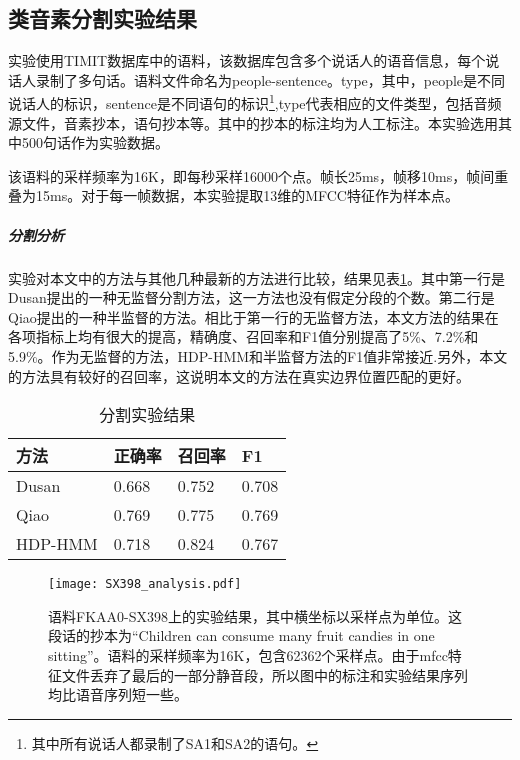 \subsection{类音素分割实验结果}
实验使用TIMIT\cite{Garofolo:93:TIMIT}数据库中的语料，该数据库包含多个说话人的语音信息，每个说话人录制了多句话。语料文件命名为people-sentence。type，其中，people是不同说话人的标识，sentence是不同语句的标识\footnote{其中所有说话人都录制了SA1和SA2的语句。},type代表相应的文件类型，包括音频源文件，音素抄本，语句抄本等。其中的抄本的标注均为人工标注。本实验选用其中500句话作为实验数据。

该语料的采样频率为16K，即每秒采样16000个点。帧长25ms，帧移10ms，帧间重叠为15ms。对于每一帧数据，本实验提取13维的MFCC特征作为样本点。
\subparagraph{分割分析}
实验对本文中的方法与其他几种最新的方法进行比较，结果见表\ref{table:p_sg_result}。其中第一行是Dusan提出的一种无监督分割方法\cite{dusan2006relation}，这一方法也没有假定分段的个数。第二行是Qiao提出的一种半监督的方法\cite{qiao2008unsupervised}。相比于第一行的无监督方法，本文方法的结果在各项指标上均有很大的提高，精确度、召回率和F1值分别提高了5\%、7.2\%和5.9\%。作为无监督的方法，HDP-HMM和半监督方法\cite{qiao2008unsupervised}的F1值非常接近.另外，本文的方法具有较好的召回率，这说明本文的方法在真实边界位置匹配的更好。

\begin{table}
\vspace{4pt}
\begin{center}\small
\begin{tabular}{|l|l|l|l|}
\hline \bf 方法 & \bf 正确率 & \bf 召回率 & \bf F1 \\ \hline
Dusan\cite{dusan2006relation} & 0.668 &0.752 &  0.708 \\ \hline
Qiao\cite{qiao2008unsupervised} &  0.769 & 0.775 & 0.769 \\ \hline
HDP-HMM &  0.718 & 0.824 & 0.767 \\ \hline
\end{tabular}
\end{center}
\vspace{-8pt}
\caption{分割实验结果}\label{table:p_sg_result}
\vspace{-4pt}
\end{table}

\begin{figure}
\texttt{[image: SX398\_analysis.pdf]} 
\vspace{-4pt}
  \caption{语料FKAA0-SX398上的实验结果，其中横坐标以采样点为单位。这段话的抄本为“Children can consume many fruit candies in one sitting”。语料的采样频率为16K，包含62362个采样点。由于mfcc特征文件丢弃了最后的一部分静音段，所以图中的标注和实验结果序列均比语音序列短一些。} \label{fig:SX398_analysis}
  \vspace{-8pt}
\end{figure}

